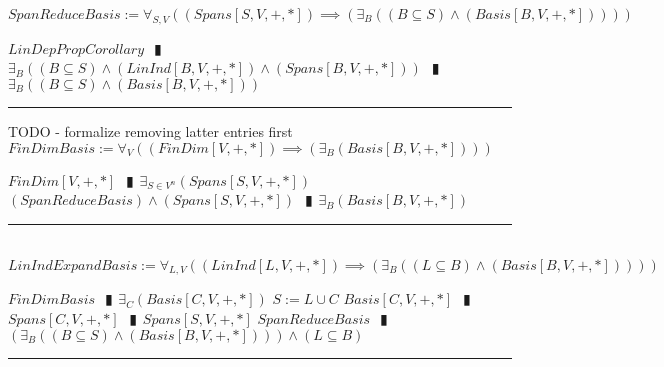 \documentclass{book}
\newcommand{\abr}{:=}
\newcommand{\pipe}{$\phantom{(}\vrectangleblack\phantom{)}$}
\begin{document}
$SpanReduceBasis \abr \forall_{S, V}((Spans[S, V, +, *]) \implies (\exists_{B}((B \subseteq S) \land (Basis[B, V, +, *]))))$
\begin{enumerate}
  \lit $LinDepPropCorollary$ \pipe $\exists_{B}((B \subseteq S) \land (LinInd[B, V, +, *]) \land (Spans[B, V, +, *]))$ \pipe $\exists_{B}((B \subseteq S) \land (Basis[B, V, +, *]))$
\end{enumerate} \vspace{.75mm} \hrule \vspace{.75mm} TODO - formalize removing latter entries first \ \\ 

$FinDimBasis \abr \forall_{V}((FinDim[V, +, *]) \implies (\exists_{B}(Basis[B, V, +, *])))$
\begin{enumerate}
  \lit $FinDim[V, +, *]$ \pipe $\exists_{S \in V^n}(Spans[S, V, +, *])$
  \lit $(SpanReduceBasis) \land (Spans[S, V, +, *])$ \pipe $\exists_{B}(Basis[B, V, +, *])$
\end{enumerate} \vspace{.75mm} \hrule \vspace{.75mm} \ \\ 

$LinIndExpandBasis \abr \forall_{L, V}((LinInd[L, V, +, *]) \implies (\exists_{B}((L \subseteq B) \land (Basis[B, V, +, *]))))$
\begin{enumerate}
  \lit $FinDimBasis$ \pipe $\exists_{C}(Basis[C, V, +, *])$
  \lit $S \abr L \cup C$
  \lit $Basis[C, V, +, *]$ \pipe $Spans[C, V, +, *]$ \pipe $Spans[S, V, +, *]$
  \lit $SpanReduceBasis$ \pipe $(\exists_{B}((B \subseteq S) \land (Basis[B, V, +, *]))) \land (L \subseteq B)$ 
\end{enumerate} \vspace{.75mm} \hrule \vspace{.75mm} \ \\ 
\end{document}
